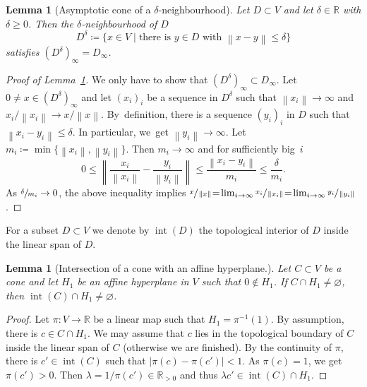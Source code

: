 \documentclass[JEP,XML,SOM,Unicode]{cedram}
\theoremstyle{plain}
\newtheorem{lemma}[theorem]{Lemma}
\theoremstyle{definition}
\DeclareMathOperator{\inter}{int}
\newcommand{\norm}[1]{\left\lVert#1\right\rVert}
\newcommand{\RR}{\mathbb{R}}
\newcommand{\set}[2]{\{#1 \mid #2\}}
\begin{document}
\begin{lemma}[Asymptotic cone of a $\delta$-neighbourhood]
\label{lem.Asymptotic_cone_delt_neighb}
Let $D \subset V$ and let $\delta \in \RR$ with $\delta \geq 0$. Then
the $\delta$-neighbourhood of $D$
\[
D^{\delta} \coloneqq \set{x \in V}{\textrm{there is $y \in D$ with $\norm{x-y} \leq \delta$}}
\]
satisfies $(D^{\delta})_{\infty} = D_{\infty}$.
\end{lemma}

\begin{proof}[Proof of Lemma~\ref{lem.Asymptotic_cone_delt_neighb}]
We only have to show that $(D^{\delta})_{\infty} \subset D_{\infty}$. Let
$0 \neq x \in (D^{\delta})_{\infty}$ and let
$(x_i)_i$ be a sequence
in $D^{\delta}$ such that $\norm{x_i} \to \infty$ and $x_i / \norm{x_i} \to x / \norm{x}$.
By~definition,
there is a sequence $(y_i)_i$ in $D$ such that $\norm{x_i-y_i} \leq \delta$. In particular, we~get
$\norm{y_i} \to \infty$. Let $m_i \coloneqq \min\{\norm{x_i}, \norm{y_i}\}$. Then $m_i \to \infty$
and for sufficiently big~$i$
\[
0 \leq \norm{\frac{x_i}{\norm{x_i}}-\frac{y_i}{\norm{y_i}}} \leq \frac{\norm{x_i-y_i}}{m_i} \leq \frac{\delta}{m_i}.
\]
As $\sfrac{\delta}{m_i} \to 0$, the above inequality
implies
$\sfrac{x}{\norm{x}}\!=\!\lim_{i \to \infty} \sfrac{x_i}{\norm{x_i}}\!=\!\lim_{i \to \infty} \sfrac{y_i}{\norm{y_i}}$.
\end{proof}

For a subset $D \subset V$ we denote by $\inter(D)$ the topological interior
of $D$ inside the linear span of $D$.

\begin{lemma}[Intersection of a cone with an affine hyperplane.]
\label{lem.Intersection_with_affine_hyperplane}
Let $C \subset V$ be a cone and let $H_1$ be an affine hyperplane in $V$
such that $0 \not\in H_1$. If $C \cap H_1 \neq \varnothing$, then $\inter(C) \cap H_1 \neq \varnothing$.
\end{lemma}

\begin{proof}
Let $\pi \colon V \to \RR$ be a linear map such that $H_1 = \pi^{-1}(1)$.
By assumption, there is $c \in C \cap H_1$.
We may assume that $c$ lies in the topological boundary of $C$ inside the linear span of $C$
(otherwise we are finished).
By the continuity
of $\pi$, there is $c' \in \inter(C)$ such that $|\pi(c)- \pi(c')| < 1$. As $\pi(c) = 1$, we
get $\pi(c') > 0$. Then $\lambda = 1 / \pi(c') \in \RR_{> 0}$ and thus
$\lambda c' \in \inter(C) \cap H_1$.
\end{proof}
\end{document}
